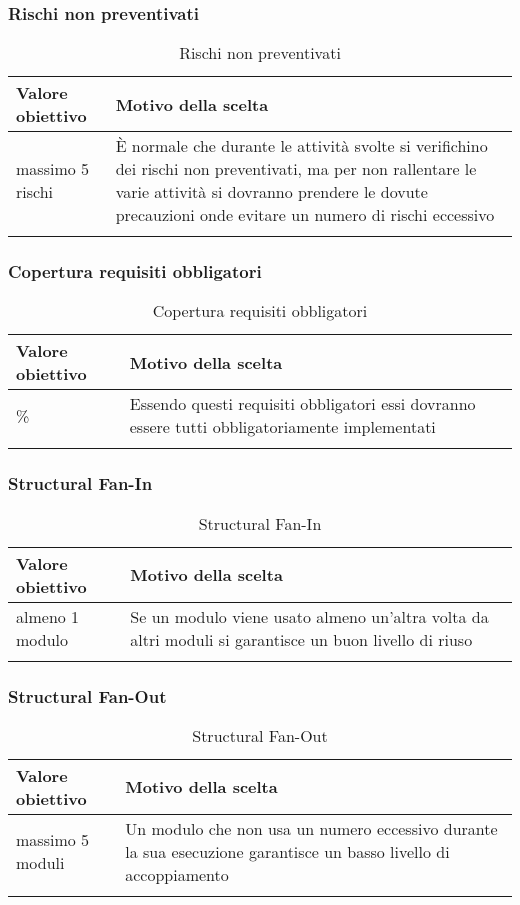 \documentclass[../PianoDiQualifica_v4.0.0.tex]{subfiles}
\begin{document}
		\subsubsection{Rischi non preventivati}
			\begin{longtable}[c] { >{\centering\arraybackslash}p{4cm} p{7cm} }
				\toprule
				\centerline{\textbf{Valore obiettivo}} & \centerline{\textbf{Motivo della scelta}} \\
				\midrule
					massimo 5 rischi &	È normale che durante le attività svolte si verifichino dei rischi non preventivati, ma per non rallentare le varie attività si dovranno prendere le dovute precauzioni onde evitare un numero di rischi eccessivo  \\
				\bottomrule
				\caption{Rischi non preventivati}
			\end{longtable}

		\subsubsection{Copertura requisiti obbligatori}
			\begin{longtable}[c] { >{\centering\arraybackslash}p{4cm} p{7cm} }
				\toprule
				\centerline{\textbf{Valore obiettivo}} & \centerline{\textbf{Motivo della scelta}} \\
				\midrule
					100\% &	Essendo questi requisiti obbligatori essi dovranno essere tutti obbligatoriamente implementati \\
				\bottomrule
				\caption{Copertura requisiti obbligatori}
			\end{longtable}

		\subsubsection{Structural Fan-In}
			\begin{longtable}[c] { >{\centering\arraybackslash}p{4cm} p{7cm} }
				\toprule
				\centerline{\textbf{Valore obiettivo}} & \centerline{\textbf{Motivo della scelta}} \\
				\midrule
					almeno 1 modulo &	Se un modulo viene usato almeno un'altra volta da altri moduli si garantisce un buon livello di riuso  \\
				\bottomrule
				\caption{Structural Fan-In}
			\end{longtable}

		\subsubsection{Structural Fan-Out}
			\begin{longtable}[c] { >{\centering\arraybackslash}p{4cm} p{7cm} }
				\toprule
				\centerline{\textbf{Valore obiettivo}} & \centerline{\textbf{Motivo della scelta}} \\
				\midrule
					massimo 5 moduli &	Un modulo che non usa un numero eccessivo durante la sua esecuzione garantisce un basso livello di accoppiamento \\
				\bottomrule
				\caption{Structural Fan-Out}
			\end{longtable}
\end{document}
